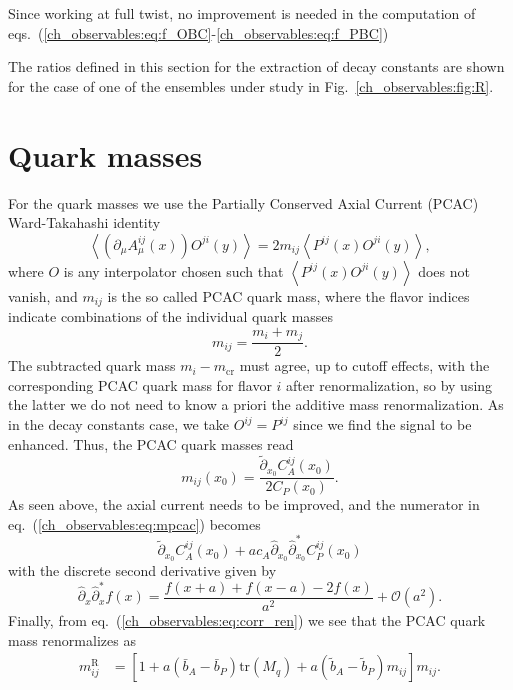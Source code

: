 Since working at full twist, no improvement is needed in the computation of eqs.~(\ref{ch_observables:eq:f_OBC}-\ref{ch_observables:eq:f_PBC})

The ratios defined in this section for the extraction of decay constants are shown for the case of one of the ensembles under study in Fig.~\ref{ch_observables:fig:R}.


\section{Quark masses}
\label{ch_observables:sec:quark_mass}

For the quark masses we use the Partially Conserved Axial Current (PCAC) Ward-Takahashi identity
\begin{equation}
\label{ch_observables:eq:PCAC}
\left<\left(\partial_{\mu}A^{ij}_{\mu}(x)\right)O^{ji}(y)\right>=2m_{ij}\left<P^{ij}(x)O^{ji}(y)\right>,
\end{equation}
where $O$ is any interpolator chosen such that $\left<P^{ij}(x)O^{ji}(y)\right>$ does not vanish, and $m_{ij}$ is the so called PCAC quark mass, where the flavor indices indicate combinations of the individual quark masses
\begin{equation}
m_{ij}=\frac{m_i+m_{j}}{2}.
\end{equation}
The subtracted quark mass $m_{i}-m_{\textrm{cr}}$ must agree, up to cutoff effects, with the corresponding PCAC quark mass for flavor $i$ after renormalization, so by using the latter we do not need to know a priori the additive mass renormalization. As in the decay constants case, we take $O^{ij}=P^{ij}$ since we find the signal to be enhanced. Thus, the PCAC quark masses read
\begin{equation}
\label{ch_observables:eq:mpcac}
m_{ij}(x_0)=\frac{\tilde{\partial}_{x_0}C_A^{ij}(x_0)}{2C_P(x_0)}.
\end{equation}
As seen above, the axial current needs to be improved, and the numerator in eq.~(\ref{ch_observables:eq:mpcac}) becomes
\begin{equation}
\tilde{\partial}_{x_0}C_A^{ij}(x_0)+ac_A\hat{\partial}_{x_0}\hat{\partial}^*_{x_0}C_P^{ij}(x_0)
\end{equation}
with the discrete second derivative given by
\begin{equation}
\hat{\partial}_{x}\hat{\partial}^*_xf(x)=\frac{f(x+a)+f(x-a)-2f(x)}{a^2}+\mathcal{O}(a^2).
\end{equation}
Finally, from eq.~(\ref{ch_observables:eq:corr_ren}) we see that the PCAC quark mass renormalizes as
\begin{align}
m_{ij}^{\textrm{R}}&=\left[1+a\left(\bar{b}_A-\bar{b}_P\right){\textrm{tr}}\left(M_q\right)+a\left(\tilde{b}_A-\tilde{b}_P\right)m_{ij}\right]m_{ij}.
\end{align}

